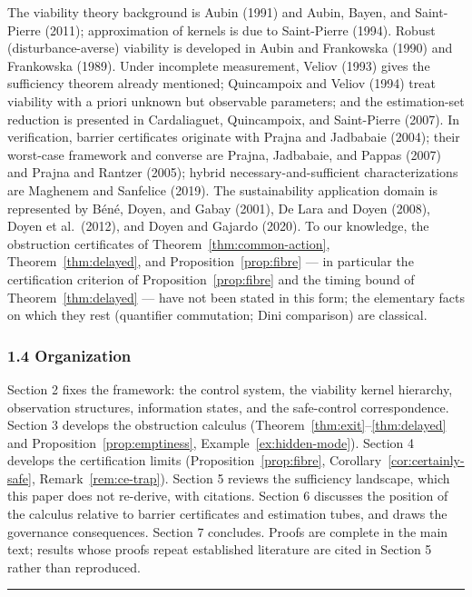 \documentclass[11pt]{article}
\theoremstyle{definition}
\begin{document}
The viability theory background is Aubin (1991) and Aubin, Bayen, and
Saint-Pierre (2011); approximation of kernels is due to Saint-Pierre
(1994). Robust (disturbance-averse) viability is developed in Aubin and
Frankowska (1990) and Frankowska (1989). Under incomplete measurement,
Veliov (1993) gives the sufficiency theorem already mentioned;
Quincampoix and Veliov (1994) treat viability with a priori unknown but
observable parameters; and the estimation-set reduction is presented in
Cardaliaguet, Quincampoix, and Saint-Pierre (2007). In verification,
barrier certificates originate with Prajna and Jadbabaie (2004); their
worst-case framework and converse are Prajna, Jadbabaie, and Pappas
(2007) and Prajna and Rantzer (2005); hybrid necessary-and-sufficient
characterizations are Maghenem and Sanfelice (2019). The sustainability
application domain is represented by B\'en\'e, Doyen, and Gabay (2001), De
Lara and Doyen (2008), Doyen et al.~(2012), and Doyen and Gajardo
(2020). To our knowledge, the obstruction certificates of Theorem~\ref{thm:common-action}, Theorem~\ref{thm:delayed}, and Proposition~\ref{prop:fibre}
--- in particular the certification criterion of Proposition~\ref{prop:fibre} and the
timing bound of Theorem~\ref{thm:delayed} --- have not been stated in this form; the elementary facts on which they rest (quantifier commutation; Dini comparison) are classical.

\subsubsection{1.4 Organization}\label{organization}

Section 2 fixes the framework: the control system, the viability kernel
hierarchy, observation structures, information states, and the
safe-control correspondence. Section 3 develops the obstruction calculus
(Theorem~\ref{thm:exit}--\ref{thm:delayed} and Proposition~\ref{prop:emptiness}, Example~\ref{ex:hidden-mode}). Section 4 develops the certification limits
(Proposition~\ref{prop:fibre}, Corollary~\ref{cor:certainly-safe}, Remark~\ref{rem:ce-trap}). Section 5 reviews the sufficiency
landscape, which this paper does not re-derive, with citations. Section
6 discusses the position of the calculus relative to barrier
certificates and estimation tubes, and draws the governance
consequences. Section 7 concludes. Proofs are complete in the main text;
results whose proofs repeat established literature are cited in Section 5 rather than reproduced.

\begin{center}\rule{0.5\linewidth}{0.5pt}\end{center}
\end{document}
